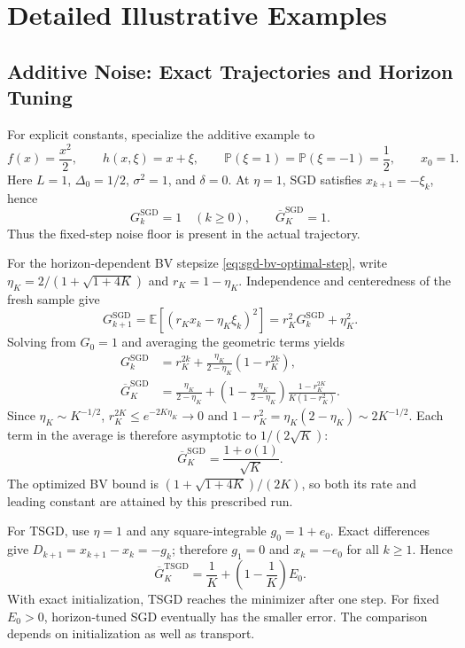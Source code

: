 \section{Detailed Illustrative Examples}
\label{app:detailed-examples}

\subsection{Additive Noise: Exact Trajectories and Horizon Tuning}
\label{app:additive-details}

For explicit constants, specialize the additive example to
\begin{equation}
\label{eq:additive-comparison-oracle}
f(x)=\frac{x^2}{2},\qquad h(x,\xi)=x+\xi,\qquad
\mathbb P(\xi=1)=\mathbb P(\xi=-1)=\frac12,\qquad x_0=1.
\end{equation}
Here $L=1$, $\Delta_0=1/2$, $\sigma^2=1$, and $\delta=0$.
At $\eta=1$, SGD satisfies $x_{k+1}=-\xi_k$, hence
\begin{equation}
\label{eq:additive-sgd-fixed}
G_k^{\mathrm{SGD}}=1\quad(k\geq0),\qquad
\boxed{\overline G_K^{\mathrm{SGD}}=1.}
\end{equation}
Thus the fixed-step noise floor is present in the actual trajectory.

For the horizon-dependent BV stepsize
\eqref{eq:sgd-bv-optimal-step}, write
$\eta_K=2/(1+\sqrt{1+4K})$ and $r_K=1-\eta_K$.
Independence and centeredness of the fresh sample give
\[
G_{k+1}^{\mathrm{SGD}}
=\mathbb E[(r_Kx_k-\eta_K\xi_k)^2]
=r_K^2G_k^{\mathrm{SGD}}+\eta_K^2.
\]
Solving from $G_0=1$ and averaging the geometric terms yields
\begin{align*}
G_k^{\mathrm{SGD}}
&=r_K^{2k}+\frac{\eta_K}{2-\eta_K}(1-r_K^{2k}),\\
\overline G_K^{\mathrm{SGD}}
&=\frac{\eta_K}{2-\eta_K}
+\left(1-\frac{\eta_K}{2-\eta_K}\right)
\frac{1-r_K^{2K}}{K(1-r_K^2)}.
\end{align*}
Since $\eta_K\sim K^{-1/2}$,
$r_K^{2K}\leq e^{-2K\eta_K}\to0$ and
$1-r_K^2=\eta_K(2-\eta_K)\sim2K^{-1/2}$.
Each term in the average is therefore asymptotic to $1/(2\sqrt K)$:
\begin{equation}
\label{eq:additive-sgd-tuned}
\boxed{\overline G_K^{\mathrm{SGD}}=\frac{1+o(1)}{\sqrt K}.}
\end{equation}
The optimized BV bound is $(1+\sqrt{1+4K})/(2K)$, so both its
rate and leading constant are attained by this prescribed run.

For TSGD, use $\eta=1$ and any square-integrable $g_0=1+e_0$.
Exact differences give $D_{k+1}=x_{k+1}-x_k=-g_k$;
therefore $g_1=0$ and $x_k=-e_0$ for all $k\geq1$. Hence
\begin{equation}
\label{eq:additive-tsgd-exact}
\boxed{\overline G_K^{\mathrm{TSGD}}
=\frac1K+\left(1-\frac1K\right)E_0.}
\end{equation}
With exact initialization, TSGD reaches the minimizer after one
step. For fixed $E_0>0$, horizon-tuned SGD eventually has the smaller
error. The comparison depends on initialization as well as transport.

